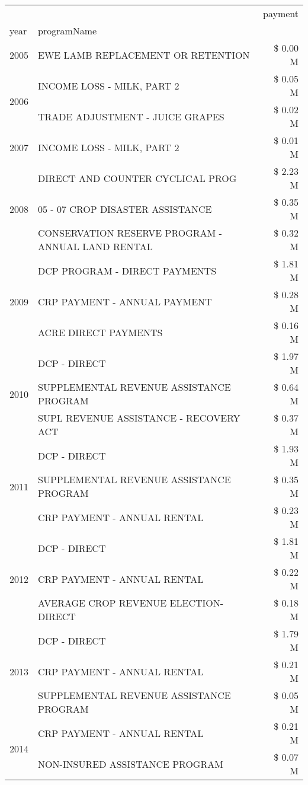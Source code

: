\begin{tabular}{llr}
\toprule
 &  & payment \\
year & programName &  \\
\midrule
2005 & EWE LAMB REPLACEMENT OR RETENTION & \$ 0.00 M \\
\cline{1-3}
\multirow[t]{2}{*}{2006} & INCOME LOSS - MILK, PART 2 & \$ 0.05 M \\
 & TRADE ADJUSTMENT - JUICE GRAPES & \$ 0.02 M \\
\cline{1-3}
2007 & INCOME LOSS - MILK, PART 2 & \$ 0.01 M \\
\cline{1-3}
\multirow[t]{3}{*}{2008} & DIRECT AND COUNTER CYCLICAL PROG & \$ 2.23 M \\
 & 05 - 07 CROP DISASTER ASSISTANCE & \$ 0.35 M \\
 & CONSERVATION RESERVE PROGRAM - ANNUAL LAND RENTAL & \$ 0.32 M \\
\cline{1-3}
\multirow[t]{3}{*}{2009} & DCP PROGRAM - DIRECT PAYMENTS & \$ 1.81 M \\
 & CRP PAYMENT - ANNUAL PAYMENT & \$ 0.28 M \\
 & ACRE DIRECT PAYMENTS & \$ 0.16 M \\
\cline{1-3}
\multirow[t]{3}{*}{2010} & DCP - DIRECT & \$ 1.97 M \\
 & SUPPLEMENTAL REVENUE ASSISTANCE PROGRAM & \$ 0.64 M \\
 & SUPL REVENUE ASSISTANCE - RECOVERY ACT & \$ 0.37 M \\
\cline{1-3}
\multirow[t]{3}{*}{2011} & DCP - DIRECT & \$ 1.93 M \\
 & SUPPLEMENTAL REVENUE ASSISTANCE PROGRAM & \$ 0.35 M \\
 & CRP PAYMENT - ANNUAL RENTAL & \$ 0.23 M \\
\cline{1-3}
\multirow[t]{3}{*}{2012} & DCP - DIRECT & \$ 1.81 M \\
 & CRP PAYMENT - ANNUAL RENTAL & \$ 0.22 M \\
 & AVERAGE CROP REVENUE ELECTION-DIRECT & \$ 0.18 M \\
\cline{1-3}
\multirow[t]{3}{*}{2013} & DCP - DIRECT & \$ 1.79 M \\
 & CRP PAYMENT - ANNUAL RENTAL & \$ 0.21 M \\
 & SUPPLEMENTAL REVENUE ASSISTANCE PROGRAM & \$ 0.05 M \\
\cline{1-3}
\multirow[t]{3}{*}{2014} & CRP PAYMENT - ANNUAL RENTAL & \$ 0.21 M \\
 & NON-INSURED ASSISTANCE PROGRAM & \$ 0.07 M \\

\end{tabular}
